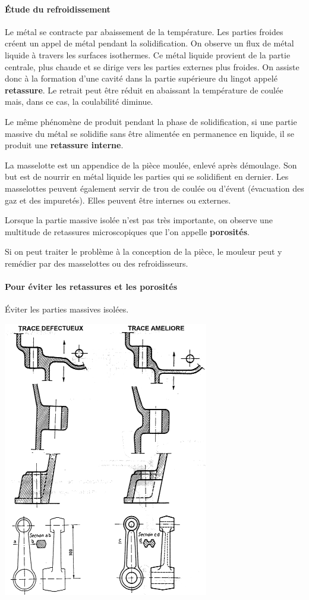 \documentclass[11pt,oneside]{article}
\begin{document}
\paragraph*{Étude du refroidissement}
Le métal se contracte par abaissement de la température. Les parties froides
créent un appel de métal pendant la solidification. On observe un flux de métal
liquide à travers les surfaces isothermes. Ce métal liquide provient de la
partie centrale, plus chaude et se dirige vers les parties externes plus
froides. On assiste donc à la formation d'une cavité dans la partie supérieure
du lingot appelé \textbf{retassure}. Le retrait peut être réduit en abaissant
la température de coulée mais, dans ce cas, la coulabilité diminue. 

Le même phénomène de produit pendant la phase de solidification, si une partie
massive du métal se solidifie sans être alimentée en permanence en liquide, il
se produit une \textbf{retassure interne}. 

La masselotte est un appendice de la pièce moulée, enlevé après démoulage. Son
but est de nourrir en métal liquide les parties qui se solidifient en dernier.
Les masselottes peuvent également servir de trou de coulée ou d'évent
(évacuation des gaz et des impuretés). Elles peuvent être internes ou externes. 

Lorsque la partie massive isolée n'est pas très importante, on observe une
multitude de retassures microscopiques que l'on appelle \textbf{porosités}. 

Si on peut traiter le problème à la conception de la pièce, le mouleur peut y
remédier par des masselottes ou des refroidisseurs. 


\paragraph*{Pour éviter les retassures et les porosités}
Éviter les parties massives isolées.


\begin{center}
 \includegraphics[width=.6\textwidth]{png/regles_massive}
\end{center}
\end{document}
